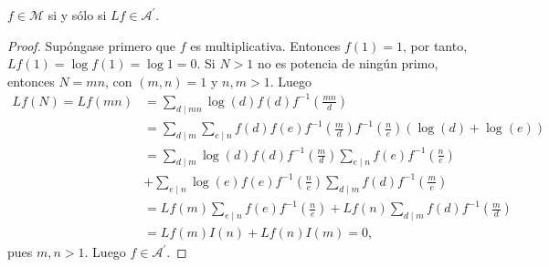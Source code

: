 \begin{proposition}
$f \in \mathcal{M}$ si y sólo si $L f \in \mathcal{A}^\prime$.
\end{proposition}
\begin{proof}
Supóngase primero que $f$ es multiplicativa. Entonces $f(1)=1$, por tanto, $L f(1)=\log f(1)=\log 1 = 0$. Si $N>1$ no es potencia de ningún primo, entonces $N=m n$, con $(m,n)=1$ y $n,m>1$. Luego
\begin{align*}
	L f(N) = L f(m n) &= \sum_{d \mid m n} \log(d)f(d)f^{-1} \left( \frac{m n}{d} \right) \\
					  &= \sum_{d \mid m}\sum_{e \mid n} f(d)f(e)f^{-1}\left( \frac{m}{d} \right)f^{-1}\left( \frac{n}{e} \right)(\log(d)+\log(e)) \\
					  &= \sum_{d \mid m} \log(d)f(d)f^{-1}\left( \frac{m}{d} \right)\sum_{e \mid n} f(e)f^{-1}\left( \frac{n}{e} \right) \\
					  &+ \sum_{e \mid n} \log(e)f(e)f^{-1}\left( \frac{n}{e} \right)\sum_{d \mid m}f(d)f^{-1}\left( \frac{m}{e} \right) \\
					  &= L f(m)\sum_{e \mid n} f(e)f^{-1}\left( \frac{n}{e} \right)+L f(n) \sum_{d \mid m}f(d)f^{-1}\left( \frac{m}{d} \right) \\
					  &= L f(m)I(n) + L f(n)I(m) = 0,
\end{align*}
pues $m,n>1$. Luego $f \in \mathcal{A}^\prime$. 
\bigskip


\end{proof}
